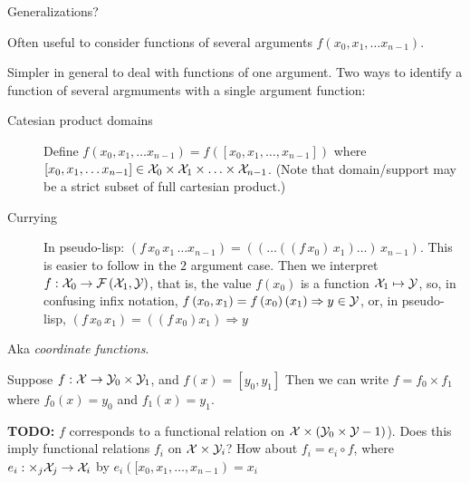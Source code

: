 Generalizations?~\cite{wiki:Implicit-function-theorem,
wiki:Inverse-function-theorem}

\label{sec:Multiple-arguments}

Often useful to consider 
functions of several arguments
$f \left( x_0, x_1, \ldots x_{n-1}\right)$.

Simpler in general to deal with functions of one argument.
Two ways to identify a function of several argmuments
with a single argument function:
\begin{description}
\item[Catesian product domains]
Define $f \left( x_0, x_1, \ldots x_{n-1} \right) 
= f \left( \left[x_0, x_1, \ldots , x_{n-1} \right]\right)$
where $\left[x_0, x_1, \ldots x_{n-1} \right] \in
\mathcal{X}_0 \times \mathcal{X}_1 \times \ldots \times \mathcal{X}_{n-1}$. 
(Note that domain/support may be a strict subset of full cartesian 
product.)
\item[Currying]
In pseudo-lisp: $\left(f \, x_0 \, x_1 \, \ldots x_{n-1} \right) 
= 
\left(
\left(
\ldots 
\left( 
\left( 
f 
\, x_0 
\right) 
\, x_1
\right) 
\ldots 
\right) 
\, x_{n-1}
\right) 
$.
This is easier to follow in the $2$ argument case.
Then we interpret $f : \mathcal{X}_0 \rightarrow 
\mathcal{F}\left(\mathcal{X}_1, \mathcal{Y} \right)$,
that is, the value $f \left( x_0 \right)$ is a function 
$\mathcal{X}_1 \mapsto \mathcal{Y}$,
so, in confusing infix notation,
$f \left( x_0 , x_1 \right) = 
f \left( x_0 \right) \left( x_1 \right) \Rightarrow y \in \mathcal{Y}$,
or, in pseudo-lisp, 
$\left( f \, x_0 \, x_1 \right) = \left( \left( f \, x_0 \right) x_1 \right) \Rightarrow y$
\end{description}

\label{sec:Cartesion-product-functions}

Aka \textit{coordinate functions}.

Suppose $f : \mathcal{X} \rightarrow \mathcal{Y}_0 \times \mathcal{Y}_1$,
and $f \left( x \right) = \left[ y_0 ,y_1 \right]$
Then we can write $f = f_0 \times f_1$ where
$f_0 \left( x \right) = y_0 $
and
$f_1 \left( x \right) = y_1 $.

\textbf{TODO:} $f$ corresponds to a functional relation on 
$\mathcal{X} \times \left( \mathcal{Y}_0 \times \mathcal{Y}-1 \right)$).
Does this imply functional relations $f_i$ on
$\mathcal{X} \times \mathcal{Y}_i$?
How about $f_i = e_i \circ f$,
where $e_i : \times_j \mathcal{X}_j  \rightarrow \mathcal{X}_i$ by
$e_i \left( [x_0, x_1, \ldots , x_{n-1} \right) = x_i$ 


